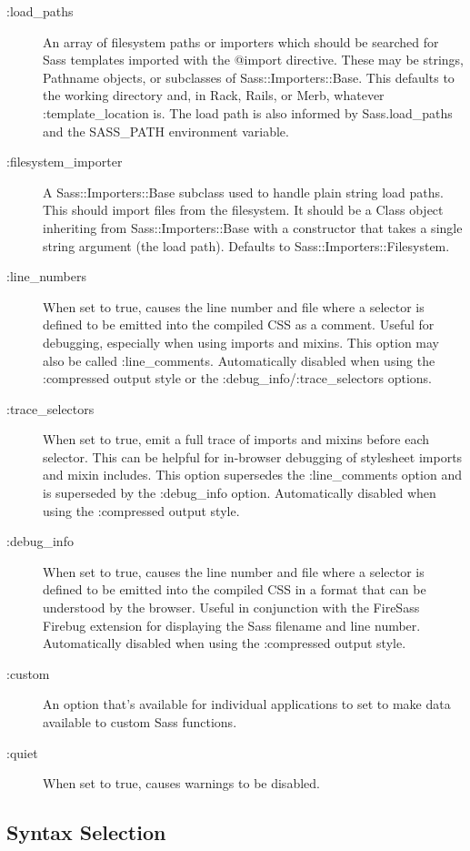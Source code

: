 \documentclass[10pt]{article}
\begin{document}
\begin{description}
\item[:load\_paths]An array of filesystem paths or importers which should be searched for Sass templates imported with the @import directive. These may be strings, Pathname objects, or subclasses of Sass::Importers::Base. This defaults to the working directory and, in Rack, Rails, or Merb, whatever :template\_location is. The load path is also informed by Sass.load\_paths and the SASS\_PATH environment variable.
\item[:filesystem\_importer]A Sass::Importers::Base subclass used to handle plain string load paths. This should import files from the filesystem. It should be a Class object inheriting from Sass::Importers::Base with a constructor that takes a single string argument (the load path). Defaults to Sass::Importers::Filesystem.
\item[:line\_numbers]When set to true, causes the line number and file where a selector is defined to be emitted into the compiled CSS as a comment. Useful for debugging, especially when using imports and mixins. This option may also be called :line\_comments. Automatically disabled when using the :compressed output style or the :debug\_info/:trace\_selectors options.
\item[:trace\_selectors]When set to true, emit a full trace of imports and mixins before each selector. This can be helpful for in-browser debugging of stylesheet imports and mixin includes. This option supersedes the :line\_comments option and is superseded by the :debug\_info option. Automatically disabled when using the :compressed output style.
\item[:debug\_info]When set to true, causes the line number and file where a selector is defined to be emitted into the compiled CSS in a format that can be understood by the browser. Useful in conjunction with the FireSass Firebug extension for displaying the Sass filename and line number. Automatically disabled when using the :compressed output style.
\item[:custom]An option that’s available for individual applications to set to make data available to custom Sass functions.
\item[:quiet]When set to true, causes warnings to be disabled.

\end{description}
\subsection{Syntax Selection}
\end{document}
